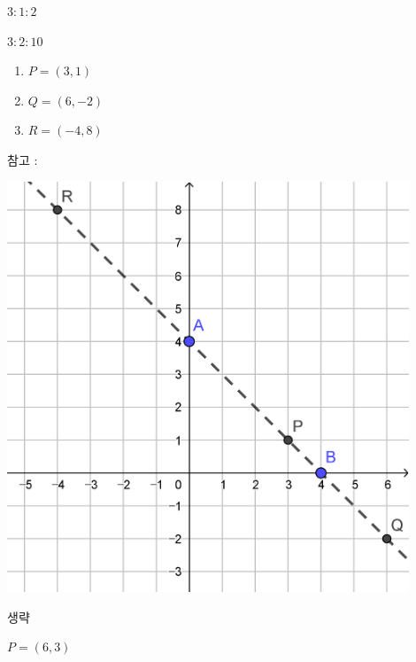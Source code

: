 \documentclass{oblivoir}
\begin{document}
\begin{minipage}[t]{0.49\textwidth}
%
\(3:1:2\)

%
\(3:2:10\)

%
\begin{enumerate}
\item
\(P=(3,1)\)
\item
\(Q=(6,-2)\)
\item
\(R=(-4,8)\)
\end{enumerate}
참고 :\\
\begin{center}
\includegraphics[width=0.9\textwidth]{intt_03}
\end{center}

%
생략

%
\(P=(6,3)\)

\end{minipage}
\end{document}
